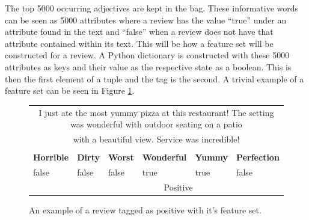 The top 5000 occurring adjectives are kept in the bag. These informative words can be seen as 5000 attributes where a review has the value ``true'' under an attribute found in the text and ``false'' when a review does not have that attribute contained within its text. This will be how a feature set will be constructed for a review. A Python dictionary is constructed with these 5000 attributes as keys and their value as the respective state as a boolean. This is then the first element of a tuple and the tag is the second. A trivial example of a feature set can be seen in Figure \ref{fig:bog-attri}.

\begin{figure}[h!]
    \centering
    \begin{tabular}{ |p{2cm}|p{2cm}|p{2cm}|p{2cm}|p{2cm}|p{2cm}|}
        \hline
        \rowcolor{Gray}
        \multicolumn{6}{|c|}{Review Text}                                                                                                       \\
        \hline
        \multicolumn{6}{|c|}{I just ate the most yummy pizza at this restaurant! The setting was wonderful with outdoor seating on a patio}     \\
        \multicolumn{6}{|c|}{ with a beautiful view. Service was incredible!}                                     \\
        \hline
        \rowcolor{Gray}
        \multicolumn{6}{|c|}{Feature Set}                                                                                                       \\
        \hline
        \textbf{Horrible}         & \textbf{Dirty}                 & \textbf{Worst} & \textbf{Wonderful} & \textbf{Yummy} & \textbf{Perfection} \\
        \hline
        false                     & false                          & false          & true               & true           & false               \\
        \hline
        \rowcolor{LightGray}
        \multicolumn{1}{|c|}{Tag} & \multicolumn{5}{|c|}{Positive}                                                                              \\
        \hline
    \end{tabular}
    \vspace*{5mm}
    \caption{An example of a review tagged as positive with it's feature set.}
    \label{fig:bog-attri}
\end{figure}

